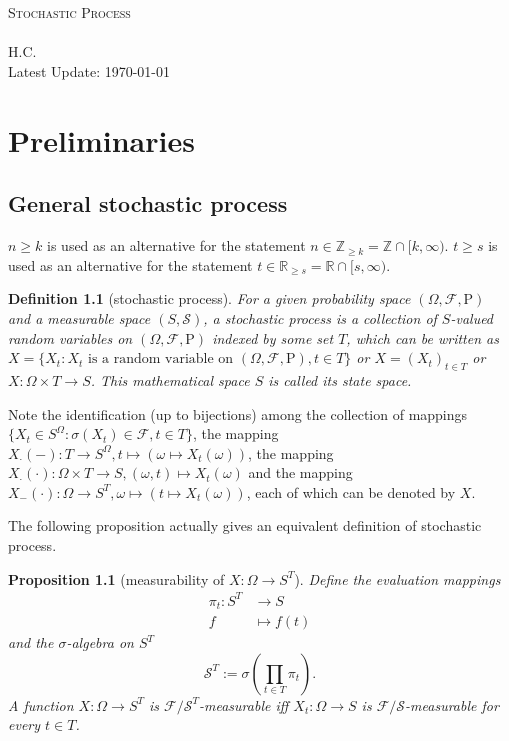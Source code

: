\documentclass{report}
\newtheorem{definition}{Definition}[section]
\newtheorem{proposition}{Proposition}[section]
\theoremstyle{nonumberplain}
\begin{document}
~\\
\begin{center}	
	~\\ 
	\vspace{6em} 
	\textsc{\Huge Stochastic Process}	
	~\\
	\vspace{2.5em} 
	{\Large }
	~\\
	\vspace{6em}
	\textsf{H.C.}
	~\\
	\vspace{5in}  
	{\large Latest Update: \today}
\end{center}
\tableofcontents
\chapter{Preliminaries}
\section{General stochastic process}
$n \ge k$ is used as an alternative for the
statement $n\in\mathbb{Z}_{\ge k}=\mathbb{Z}\cap[k,\infty)$. $t \ge s$ is used as an alternative for the statement $t\in\mathbb{R}_{\ge s}=\mathbb{R}\cap[s,\infty)$.
\begin{definition}[stochastic process]
For a given probability space $(\Omega ,{\mathcal{F}},\mathrm{P})$ and a measurable space $(S,\mathcal{S})$, a \emph{stochastic process} is a collection of $S$-valued random variables on $(\Omega ,{\mathcal{F}},\mathrm{P})$ indexed by some set $T$, which can be written as $X=\{X_t:X_t\text{ is a random variable on } (\Omega ,\mathcal{F},\mathrm{P}),t\in T\}$ or $X=(X_t)_{t\in T}$ or $X:\Omega \times T\rightarrow S$. This mathematical space $S$ is called its state space. 
\end{definition}

Note the identification (up to bijections) among the collection of mappings $\{X_t\in S^\Omega:\sigma(X_t)\in\mathcal{F},t\in T\}$, the mapping $X_\cdot(-):T \to S^\Omega,t\mapsto\left(\omega\mapsto X_{t}(\omega)\right)$, the mapping $X_\cdot(\cdot):\Omega \times T\rightarrow S,(\omega,t)\mapsto X_t(\omega)$ and the mapping $X_{-}(\cdot):\Omega\to S^T,\omega\mapsto \left(t\mapsto X_{t}(\omega)\right)$, each of which can be denoted by $X$.

The following proposition actually gives an equivalent definition of stochastic process.
\begin{proposition}[measurability of $X:\Omega\to S^T$]
	Define the evaluation mappings
	\begin{align*}
	\pi_t:S^T&\longrightarrow S\\
	f&\longmapsto f(t)
	\end{align*}
	and the $\sigma$-algebra on $S^T$
	\[
	\mathcal{S}^T:=\sigma\left(\prod_{t\in T}\pi_t\right).
	\]
	A function $X: \Omega \rightarrow S^T$ is $\mathcal{F}/\mathcal{S}^{T}$-measurable iff $X_{t}: \Omega \rightarrow S$ is $\mathcal{F}/\mathcal{S}$-measurable for every $t \in T$.
\end{proposition}
\end{document}
